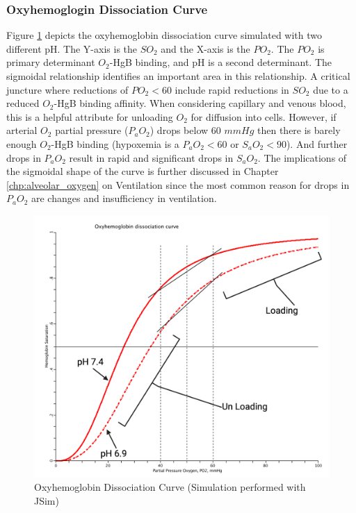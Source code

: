 \subsubsection{Oxyhemoglogin Dissociation Curve}

Figure \ref{fig:oxyhemo1} depicts the oxyhemoglobin dissociation curve simulated with two different pH. The Y-axis is the $SO_2$ and the X-axis is the $PO_2$. The $PO_2$ is primary determinant $O_2$-HgB binding, and pH is a second determinant. The sigmoidal relationship identifies an important area in this relationship. A critical juncture where reductions of $PO_2 < 60$ include rapid reductions in $SO_2$ due to a reduced $O_2$-HgB binding affinity. When considering capillary and venous blood, this is a helpful attribute for unloading $O_2$ for diffusion into cells. However, if arterial $O_2$ partial pressure ($P_aO_2$) drops below 60 $mmHg$ then there is barely enough $O_2$-HgB binding (hypoxemia is a $P_aO_2 <60$ or $S_aO_2 < 90$). And further drops in $P_aO_2$ result in rapid and significant drops in $S_aO_2$. The implications of the sigmoidal shape of the curve is further discussed in Chapter \ref{chp:alveolar_oxygen} on Ventilation since the most common reason for drops in $P_aO_2$ are changes and insufficiency in ventilation. 

\begin{figure}[!h]
    \centering
    \includegraphics[width=1.0\linewidth]{./figure/oxyhemo1.png}
    \caption{Oxyhemoglobin Dissociation Curve \footnotesize{(Simulation performed with JSim\footnotemark{})}}
    \label{fig:oxyhemo1}
\end{figure}

